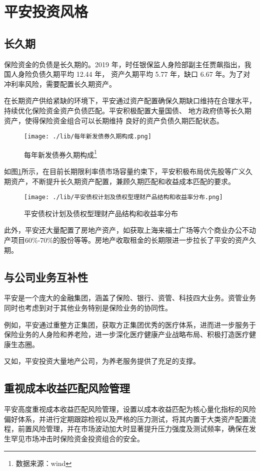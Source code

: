 \documentclass[11pt]{ctexart}
\begin{document}
\section{平安投资风格}
\label{sec:org841b88f}
\subsection{长久期}
\label{sec:org7b3d3f1}
保险资金的负债是长久期的。2019 年，时任银保监人身险部副主任贾飙指出，我国人身险负债久期平均 12.44 年， 资产久期平均 5.77 年，缺口 6.67 年。为了对冲利率风险，需要配置长久期资产。

在长期资产供给紧缺的环境下，平安通过资产配置确保久期缺口维持在合理水平，持续优化保险资金资产负债匹配。平安积极配置大量国债、 地方政府债等长久期资产，使得保险资金组合可以长期维持 良好的资产负债久期匹配状态。

\begin{figure}[htbp]
\centering
\texttt{[image: ./lib/每年新发债券久期构成.png]}
\caption[Caption for LOF]{\label{fig:duration}每年新发债券久期构成\footnote{数据来源：wind}}
\end{figure}

如图\ref{fig:duration}所示，在目前长期限利率债市场容量约束下，平安积极布局优先股等广义久期资产，不断提升长久期资产配置，兼顾久期匹配和收益成本匹配的要求。
\begin{figure}[htbp]
\centering
\texttt{[image: ./lib/平安债权计划及债权型理财产品结构和收益率分布.png]}
\caption{平安债权计划及债权型理财产品结构和收益率分布}
\end{figure}

此外，平安还大量配置了房地产资产，如获取上海来福士广场等六个商业办公不动产项目60\%-70\%的股份等等。房地产收取租金的长期限进一步拉长了平安的资产久期。
\subsection{与公司业务互补性}
\label{sec:org3b3d83c}
平安是一个庞大的金融集团，涵盖了保险、银行、资管、科技四大业务。资管业务同时也考虑到对于其他业务特别是保险业务的协同性。

例如，平安通过重整方正集团，获取方正集团优秀的医疗体系，进而进一步服务于保险业务的人身险和养老险，进一步深化医疗健康产业战略布局、积极打造医疗健康生态圈。

又如，平安投资大量地产公司，为养老服务提供了充足的支撑。

\subsection{重视成本收益匹配风险管理}
\label{sec:orgb789e09}
平安高度重视成本收益匹配风险管理，设置以成本收益匹配为核心量化指标的风险偏好体系，并进行定期跟踪检视以及严格的压力测试，将其内置于大类资产配置流程，前置风险管理，并在市场波动加大时显著提升压力强度及测试频率，确保在发生罕见市场冲击时保险资金投资组合的安全。
\end{document}
